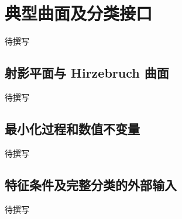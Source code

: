 
% 
% 
% 

\section{典型曲面及分类接口}
\label{g5:sec:2604}

待撰写

\subsection{射影平面与 Hirzebruch 曲面}
\label{g5:subsec:2604:01}
待撰写

\subsection{最小化过程和数值不变量}
\label{g5:subsec:2604:02}
待撰写

\subsection{特征条件及完整分类的外部输入}
\label{g5:subsec:2604:03}
待撰写
